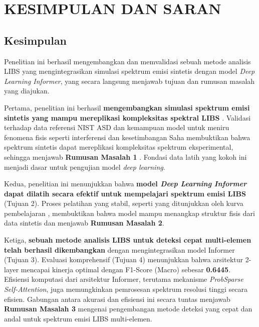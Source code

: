 \chapter{KESIMPULAN DAN SARAN}

\section{Kesimpulan}

Penelitian ini berhasil mengembangkan dan memvalidasi sebuah metode analisis LIBS yang mengintegrasikan simulasi spektrum emisi sintetis dengan model \textit{Deep Learning Informer}, yang secara langsung menjawab tujuan dan rumusan masalah yang diajukan.

Pertama, penelitian ini berhasil \textbf{mengembangkan simulasi spektrum emisi sintetis yang mampu mereplikasi kompleksitas spektral LIBS} . Validasi terhadap data referensi NIST ASD dan kemampuan model untuk meniru fenomena fisis seperti interferensi dan kesetimbangan Saha membuktikan bahwa spektrum sintetis dapat mereplikasi kompleksitas spektrum eksperimental, sehingga menjawab \textbf{Rumusan Masalah 1} . Fondasi data latih yang kokoh ini menjadi dasar untuk pengujian model \textit{deep learning}.

Kedua, penelitian ini menunjukkan bahwa \textbf{model \textit{Deep Learning Informer} dapat dilatih secara efektif untuk mempelajari spektrum emisi LIBS} (Tujuan 2). Proses pelatihan yang stabil, seperti yang ditunjukkan oleh kurva pembelajaran , membuktikan bahwa model mampu menangkap struktur fisis dari data sintetis dan menjawab \textbf{Rumusan Masalah 2}.

Ketiga, \textbf{sebuah metode analisis LIBS untuk deteksi cepat multi-elemen telah berhasil dikembangkan} dengan mengintegrasikan model Informer (Tujuan 3). Evaluasi komprehensif (Tujuan 4) menunjukkan bahwa arsitektur 2-layer mencapai kinerja optimal dengan F1-Score (Macro) sebesar \textbf{0.6445}. Efisiensi komputasi dari arsitektur Informer, terutama mekanisme \textit{ProbSparse Self-Attention}, juga memungkinkan pemrosesan spektrum resolusi tinggi secara efisien. Gabungan antara akurasi dan efisiensi ini secara tuntas menjawab \textbf{Rumusan Masalah 3} mengenai pengembangan metode deteksi yang cepat dan andal untuk spektrum emisi LIBS multi-elemen.

